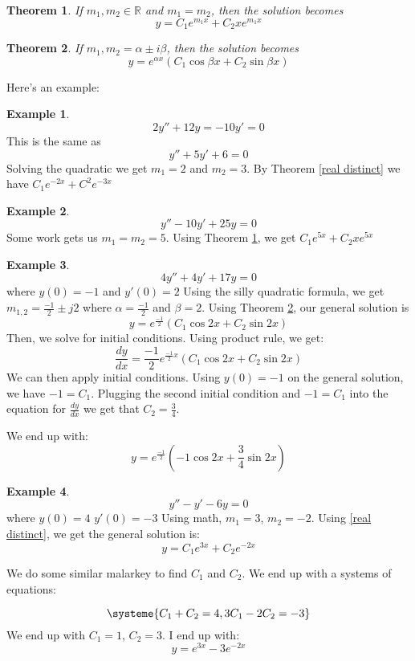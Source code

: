 \documentclass[10pt, oneside]{article}
\newtheorem{thm}{Theorem}
\theoremstyle{definition}
\newtheorem{example}{Example}[section]
\begin{document}
\begin{thm} \label{real repeated}
If $m_1, m_2 \in \mathbb{R}$ and $m_1 = m_2$, then the solution becomes 
    \[ 
    y = C_1e^{m_1x}+C_2xe^{m_1x}
    \]
\end{thm}

\begin{thm} \label{complex}
    If $m_1, m_2 = \alpha \pm i\beta$, then the solution becomes 
        \[ 
        y = e^{\alpha x}(C_1\cos{\beta x} + C_2\sin{\beta x})
        \]
    \end{thm}

Here's an example:
\begin{example}
    \[ 2y'' + 12y = -10y' = 0\] 
    This is the same as 
    \[ y'' + 5y' + 6 = 0\] 
    Solving the quadratic we get $m_1 = 2$ and $m_2 = 3$. 
    By Theorem \ref{real distinct} we have $C_1 e^{-2x} + C^2e^{-3x}$
\end{example}  

\begin{example}
\[y'' - 10 y'+ 25 y = 0\]
Some work gets us $m_1 = m_2 = 5$. Using Theorem \ref{real repeated}, we get $C_1e^{5x} + C_2xe^{5x}$
\end{example}

\begin{example}
\[4y'' + 4y'+ 17y = 0\]
where $y(0) = -1$ and $y'(0) = 2$
Using the silly quadratic formula, we get $m_{1,2} = \frac{-1}{2} \pm j2$
where $\alpha = \frac{-1}{2}$ and $\beta = 2$. Using Theorem \ref{complex}, our general solution is 
\[ 
y = e^\frac{-1}{2}(C_1\cos{2 x} + C_2\sin{2 x})
\]
Then, we solve for initial conditions. Using product rule, we get:
\[ 
\frac{dy}{dx} = \frac{-1}{2}e^{\frac{-1}{2}x}(C_1\cos{2x}+C_2\sin{2x})
\]
We can then apply initial conditions. Using $y(0) = -1$ on the general solution, we have $-1 = C_1$. Plugging the second initial condition and $-1 = C_1$ into the equation for $\frac{dy}{dx}$ we get that $C_2 = \frac{3}{4}$. 

We end up with:
\[
    y = e^\frac{-1}{2}(-1\cos{2 x} + \frac{3}{4}\sin{2 x})
\]
\end{example}

\begin{example}
    \[ 
    y'' - y' - 6y = 0
    \] 
    where $y(0) = 4$ $y'(0) = -3$
Using math, $m_1 = 3$, $m_2 = -2$. Using \ref{real distinct}, we get the general solution is:
\[ 
    y = C_1e^{3x}+C_2e^{-2x}
\]

We do some similar malarkey to find $C_1$ and $C_2$. We end up with a systems of equations: 

\begin{equation*}
    \systeme{
    C_1 + C_2 = 4,
    3C_1 - 2C_2 = -3
    }
  \end{equation*}
  We end up with $C_1 = 1$, $C_2 = 3$. I end up with:
\[ 
    y = e^{3x}-3e^{-2x}
\]

\end{example}
\end{document}
